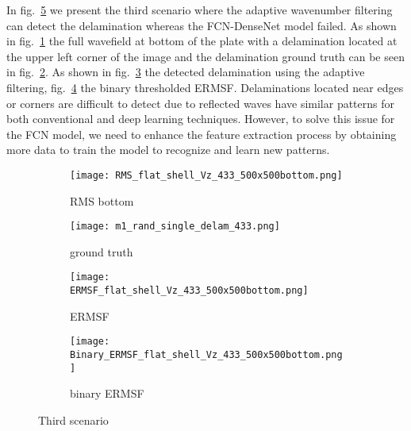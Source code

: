 	In fig.~\ref{fig:RMS433} we present the third scenario where the adaptive wavenumber filtering can detect the delamination whereas the FCN-DenseNet model failed.
	As shown in fig.~\ref{fig:RMS_flat_shell_Vz_433} the full wavefield at bottom of the plate with a delamination located at the upper left corner of the image
	and the delamination ground truth can be seen in fig.~\ref{fig:m1_rand_single_delam_433}. 
	As shown in fig.~\ref{fig:ERMSF_flat_shell_Vz_433} the detected delamination using the adaptive filtering, fig.~\ref{fig:Binary_ERMSF_flat_shell_Vz_433} the binary thresholded ERMSF. 
	Delaminations located near edges or corners are difficult to detect due to reflected waves have similar patterns for both conventional and deep learning techniques. 
	However, to solve this issue for the FCN model, we need to enhance the feature extraction process by obtaining more data to train the model to recognize and learn new patterns.	
	\begin{figure} [h!]
		\centering
		\begin{subfigure}[b]{0.47\textwidth}
			\centering
			\texttt{[image: RMS\_flat\_shell\_Vz\_433\_500x500bottom.png]}
			\caption{RMS bottom}
			\label{fig:RMS_flat_shell_Vz_433}
		\end{subfigure}
		\hfill
		\begin{subfigure}[b]{0.47\textwidth}
			\centering
			\texttt{[image: m1\_rand\_single\_delam\_433.png]}
			\caption{ground truth}
			\label{fig:m1_rand_single_delam_433}
		\end{subfigure}
		\hfill
		\begin{subfigure}[b]{0.47\textwidth}
			\centering
			\texttt{[image: ERMSF\_flat\_shell\_Vz\_433\_500x500bottom.png]}
			\caption{ERMSF}
			\label{fig:ERMSF_flat_shell_Vz_433}
		\end{subfigure}
		\hfill
		\begin{subfigure}[b]{0.47\textwidth}
			\centering
			\texttt{[image: Binary\_ERMSF\_flat\_shell\_Vz\_433\_500x500bottom.png]}
			\caption{binary ERMSF}
			\label{fig:Binary_ERMSF_flat_shell_Vz_433}
		\end{subfigure}
		
		
		\caption{Third scenario}
		\label{fig:RMS433}
	\end{figure} 
